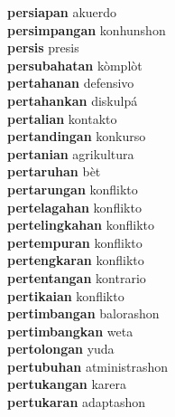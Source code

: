 \textbf{persiapan } akuerdo \\
\textbf{persimpangan } konhunshon \\
\textbf{persis } presis \\
\textbf{persubahatan } kòmplòt \\
\textbf{pertahanan } defensivo \\
\textbf{pertahankan } diskulpá \\
\textbf{pertalian } kontakto \\
\textbf{pertandingan } konkurso \\
\textbf{pertanian } agrikultura \\
\textbf{pertaruhan } bèt \\
\textbf{pertarungan } konflikto \\
\textbf{pertelagahan } konflikto \\
\textbf{pertelingkahan } konflikto \\
\textbf{pertempuran } konflikto \\
\textbf{pertengkaran } konflikto \\
\textbf{pertentangan } kontrario \\
\textbf{pertikaian } konflikto \\
\textbf{pertimbangan } balorashon \\
\textbf{pertimbangkan } weta \\
\textbf{pertolongan } yuda \\
\textbf{pertubuhan } atministrashon \\
\textbf{pertukangan } karera \\
\textbf{pertukaran } adaptashon \\
